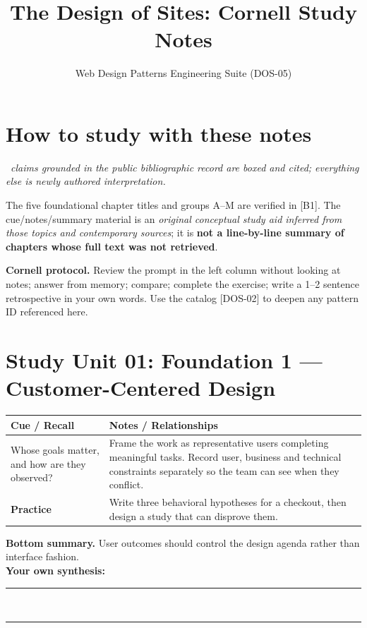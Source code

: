 \documentclass[11pt]{article}
\title{The Design of Sites: Cornell Study Notes}
\author{Web Design Patterns Engineering Suite (DOS-05)}
\date{}
\newcommand{\Provenance}{\par\noindent{\footnotesize\sffamily\color{Amber}\bfseries Provenance:}~{\footnotesize\color{Ink}\itshape claims grounded in the public bibliographic record are boxed and cited; everything else is newly authored interpretation.}\par\smallskip}
\begin{document}
\maketitle
\section{How to study with these notes}

\Provenance
\begin{groundedbox}\raggedright The five foundational chapter titles and groups A--M are verified in [B1]. The cue/notes/summary material is an \emph{original conceptual study aid inferred from those topics and contemporary sources}; it is \textbf{not a line-by-line summary of chapters whose full text was not retrieved}.\end{groundedbox}
\textbf{Cornell protocol.} Review the prompt in the left column without looking at notes; answer from memory; compare; complete the exercise; write a 1--2 sentence retrospective in your own words. Use the catalog [DOS-02] to deepen any pattern ID referenced here.

\section{Study Unit 01: Foundation 1 — Customer-Centered Design}
\begin{longtable}{@{}p{.27\linewidth}p{.66\linewidth}@{}}\toprule
\textbf{Cue / Recall} & \textbf{Notes / Relationships}\\\midrule\endhead
Whose goals matter, and how are they observed? & Frame the work as representative users completing meaningful tasks. Record user, business and technical constraints separately so the team can see when they conflict.\\
\addlinespace[4mm]
\textbf{Practice} & Write three behavioral hypotheses for a checkout, then design a study that can disprove them.\\\bottomrule\end{longtable}
\begin{dosnotebox}\textbf{Bottom summary.} User outcomes should control the design agenda rather than interface fashion.\\[2mm]
\textbf{Your own synthesis:} \rule{.72\linewidth}{.4pt}\\[4mm]
\rule{.96\linewidth}{.4pt}\end{dosnotebox}
\end{document}
